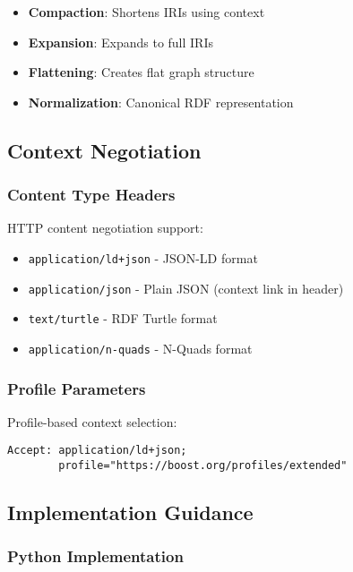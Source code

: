\begin{itemize}
    \item \textbf{Compaction}: Shortens IRIs using context
    \item \textbf{Expansion}: Expands to full IRIs
    \item \textbf{Flattening}: Creates flat graph structure
    \item \textbf{Normalization}: Canonical RDF representation
\end{itemize}

\subsection{Context Negotiation}
\label{sec:context-negotiation}

\subsubsection{Content Type Headers}

HTTP content negotiation support:

\begin{itemize}
    \item \texttt{application/ld+json} - JSON-LD format
    \item \texttt{application/json} - Plain JSON (context link in header)
    \item \texttt{text/turtle} - RDF Turtle format
    \item \texttt{application/n-quads} - N-Quads format
\end{itemize}

\subsubsection{Profile Parameters}

Profile-based context selection:

\begin{verbatim}
Accept: application/ld+json; 
        profile="https://boost.org/profiles/extended"
\end{verbatim}

\subsection{Implementation Guidance}
\label{sec:jsonld-implementation}

\subsubsection{Python Implementation}

